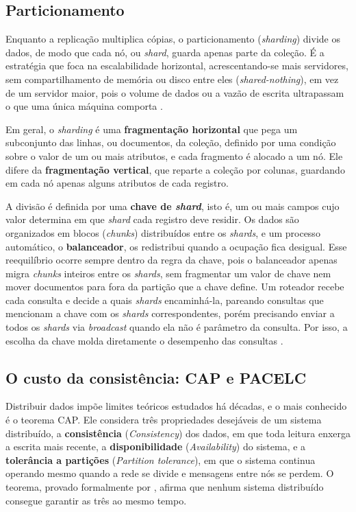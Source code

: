 \subsection{Particionamento}
\label{sub:particionamento}

Enquanto a replicação multiplica cópias, o particionamento (\textit{sharding}) divide os dados, de modo que cada nó, ou \textit{shard}, guarda apenas parte da coleção. É a estratégia que foca na escalabilidade horizontal, acrescentando-se mais servidores, sem compartilhamento de memória ou disco entre eles (\textit{shared-nothing}), em vez de um servidor maior, pois o volume de dados ou a vazão de escrita ultrapassam o que uma única máquina comporta \citep{cattell2011}.

Em geral, o \textit{sharding} é uma \textbf{fragmentação horizontal} que pega um subconjunto das linhas, ou documentos, da coleção, definido por uma condição sobre o valor de um ou mais atributos, e cada fragmento é alocado a um nó. Ele difere da \textbf{fragmentação vertical}, que reparte a coleção por colunas, guardando em cada nó apenas alguns atributos de cada registro.

A divisão é definida por uma \textbf{chave de \textit{shard}}, isto é, um ou mais campos cujo valor determina em que \textit{shard} cada registro deve residir. Os dados são organizados em blocos (\textit{chunks}) distribuídos entre os \textit{shards}, e um processo automático, o \textbf{balanceador}, os redistribui quando a ocupação fica desigual. Esse reequilíbrio ocorre sempre dentro da regra da chave, pois o balanceador apenas migra \textit{chunks} inteiros entre os \textit{shards}, sem fragmentar um valor de chave nem mover documentos para fora da partição que a chave define. Um roteador recebe cada consulta e decide a quais \textit{shards} encaminhá-la, pareando consultas que mencionam a chave com os \textit{shards} correspondentes, porém precisando enviar a todos os \textit{shards} via \textit{broadcast} quando ela não é parâmetro da consulta. Por isso, a escolha da chave molda diretamente o desempenho das consultas \citep{ozsu2020}.

\subsection{O custo da consistência: CAP e PACELC}
\label{sub:cap-pacelc}

Distribuir dados impõe limites teóricos estudados há décadas, e o mais conhecido é o teorema CAP. Ele considera três propriedades desejáveis de um sistema distribuído, a \textbf{consistência} (\textit{Consistency}) dos dados, em que toda leitura enxerga a escrita mais recente, a \textbf{disponibilidade} (\textit{Availability}) do sistema, e a \textbf{tolerância a partições} (\textit{Partition tolerance}), em que o sistema continua operando mesmo quando a rede se divide e mensagens entre nós se perdem. O teorema, provado formalmente por \citet{gilbert2002}, afirma que nenhum sistema distribuído consegue garantir as três ao mesmo tempo.

